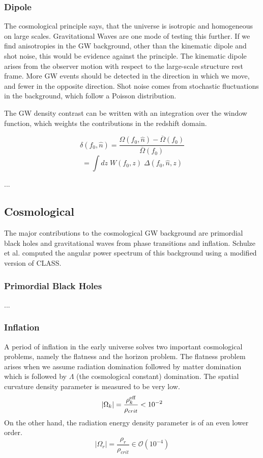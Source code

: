 \subsubsection{Dipole}
The cosmological principle says, that the universe is isotropic and homogeneous on large scales. Gravitational Waves are one mode of testing this further. If we find anisotropies in the GW background, other than the kinematic dipole and shot noise, this would be evidence against the principle.
The kinematic dipole arises from the observer motion with respect to the large-scale structure rest frame. More GW events should be detected in the direction in which we move, and fewer in the opposite direction. Shot noise comes from stochastic fluctuations in the background, which follow a Poisson distribution.

The GW density contrast can be written with an integration over the window function, which weights the contributions in the redshift domain.

\begin{equation}
    \delta(f_0, \hat{n}) = \frac{\Omega(f_0, \hat{n})-\overline{\Omega}(f_0)}{\overline{\Omega}(f_0)}
\end{equation}
\begin{equation}
    = \int dz \; W(f_0, z) \; \Delta(f_0, \hat{n}, z)
\end{equation}

...
\subsection{Cosmological}
The major contributions to the cosmological GW background are primordial
black holes and gravitational waves from phase transitions and inflation.
Schulze et al. \cite{schulze_gw_class_2023} computed the angular power spectrum 
of this background using a modified version of CLASS\cite{blas_cosmic_2011}.
\subsubsection{Primordial Black Holes}
...
\subsubsection{Inflation}

A period of inflation in the early universe solves two important cosmological problems, namely the flatness and the horizon problem. The flatness problem arises when we assume radiation domination followed by matter domination which is followed by $\Lambda$ (the cosmological constant) domination. The spatial curvature density parameter is measured to be very low. 
\begin{equation}
    |\Omega_k| = \frac{\rho_k^{\rm{eff}}}{\rho_{crit}} < 10^{-2}
\end{equation} 
On the other hand, the radiation energy density parameter is of an even lower order.
\begin{equation}
    |\Omega_r| = \frac{\rho_r}{\rho_{crit}} \in \mathcal{O}(10^{-4}) 
\end{equation}

